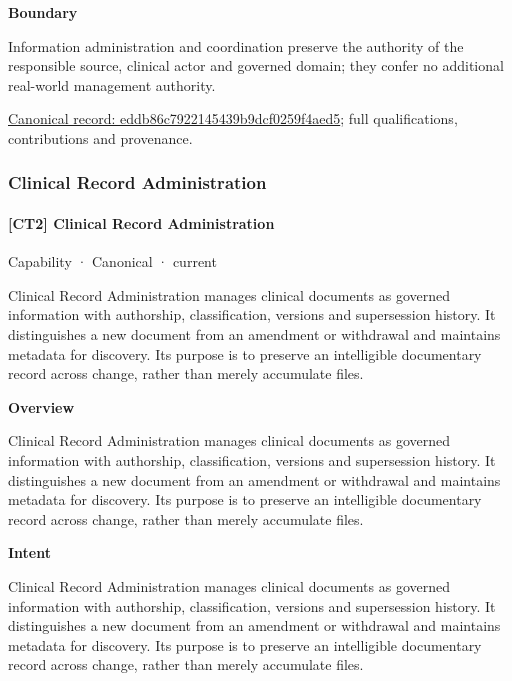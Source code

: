 \textbf{Boundary}



Information administration and coordination preserve the authority of the responsible source, clinical actor and governed domain; they confer no additional real-world management authority.


{\footnotesize \href{../../../../continuum/strategy/capability/eddb86c7922145439b9dcf0259f4aed5.md}{Canonical record: eddb86c7922145439b9dcf0259f4aed5}; full qualifications, contributions and provenance.}\par
\subsubsection{Clinical Record Administration}

\paragraph{[CT2] Clinical Record Administration}

\label{element:ce9e7e7b22054cefb707a650d5be7219}
{\small Capability · Canonical · current}\par

Clinical Record Administration manages clinical documents as governed information with authorship, classification, versions and supersession history. It distinguishes a new document from an amendment or withdrawal and maintains metadata for discovery. Its purpose is to preserve an intelligible documentary record across change, rather than merely accumulate files.



\textbf{Overview}



Clinical Record Administration manages clinical documents as governed information with authorship, classification, versions and supersession history. It distinguishes a new document from an amendment or withdrawal and maintains metadata for discovery. Its purpose is to preserve an intelligible documentary record across change, rather than merely accumulate files.



\textbf{Intent}



Clinical Record Administration manages clinical documents as governed information with authorship, classification, versions and supersession history. It distinguishes a new document from an amendment or withdrawal and maintains metadata for discovery. Its purpose is to preserve an intelligible documentary record across change, rather than merely accumulate files.



